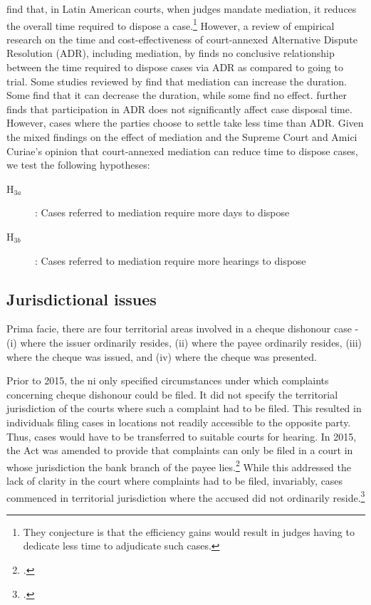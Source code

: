 \textcite{buscaglia1997_latinAmericaCourtDelays} find that, in Latin American courts, when judges mandate mediation, it reduces the overall time required to dispose a case.\footnote{They conjecture is that the efficiency gains would result in judges having to dedicate less time to adjudicate such cases.} However, a review of empirical research on the time and cost-effectiveness of court-annexed Alternative Dispute Resolution (ADR), including mediation, by \textcite{wissler2004effectiveness} finds no conclusive relationship between the time required to dispose cases via ADR as compared to going to trial. Some studies reviewed by \textcite{wissler2004effectiveness} find that mediation can increase the duration. Some find that it can decrease the duration, while some find no effect. \textcite{heise2010adr} further finds that participation in ADR does not significantly affect case disposal time. However, cases where the parties choose to settle take less time than ADR. Given the mixed findings on the effect of mediation and the Supreme Court and Amici Curiae's opinion that court-annexed mediation can reduce time to dispose cases, we test the following hypotheses:

\begin{description}
\item[H$_{3a}$]: Cases referred to mediation require more days to dispose
\item[H$_{3b}$]: Cases referred to mediation require more hearings to dispose
\end{description}

\subsection{Jurisdictional issues}

Prima facie, there are four territorial areas involved in a cheque dishonour case - (i) where the issuer ordinarily resides, (ii) where the payee ordinarily resides, (iii) where the cheque was issued, and (iv) where the cheque was presented. 

Prior to 2015, the \gls{ni} only specified circumstances under which complaints concerning cheque dishonour could be filed. It did not specify the territorial jurisdiction of the courts where such a complaint had to be filed. This resulted in individuals filing cases in locations not readily accessible to the opposite party. Thus, cases would have to be transferred to suitable courts for hearing. In 2015, the Act was amended to provide that complaints can only be filed in a court in whose jurisdiction the bank branch of the payee lies.\footcite{niAmend2015} While this addressed the lack of clarity in the court where complaints had to be filed, invariably, cases commenced in territorial jurisdiction where the accused did not ordinarily reside.\footcite{amicus2020_submission}

